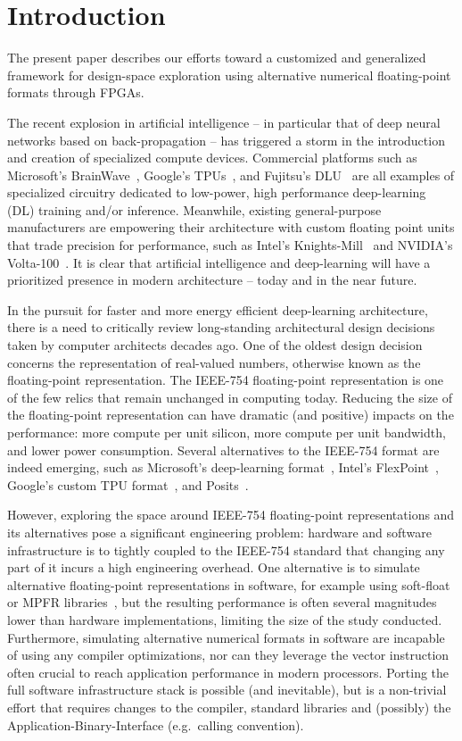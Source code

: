 \documentclass[techrep,english]{ipsj} %
\begin{document}
\section{Introduction}
The present paper describes our efforts toward a customized and generalized framework for design-space exploration using alternative numerical floating-point formats through FPGAs.

The recent explosion in artificial intelligence – in particular that of deep neural networks based on back-propagation – has triggered a storm in the introduction and creation of specialized compute devices.
Commercial platforms such as Microsoft’s BrainWave~\cite{msbrainwave}, Google’s TPUs~\cite{googletpu}, and Fujitsu’s DLU~\cite{fujitsudlu} are all examples of specialized circuitry dedicated to low-power, high performance deep-learning (DL) training and/or inference.
Meanwhile, existing general-purpose manufacturers are empowering their architecture with custom floating point units that trade precision for performance, such as Intel’s Knights-Mill~\cite{knm} and NVIDIA’s Volta-100~\cite{volta100}.
It is clear that artificial intelligence and deep-learning will have a prioritized presence in modern architecture -- today and in the near future.

In the pursuit for faster and more energy efficient deep-learning architecture, there is a need to critically review long-standing architectural design decisions taken by computer architects decades ago.
One of the oldest design decision concerns the representation of real-valued numbers, otherwise known as the floating-point representation.
The IEEE-754 floating-point representation is one of the few relics that remain unchanged in computing today.
Reducing the size of the floating-point representation can have dramatic (and positive) impacts on the performance: more compute per unit silicon, more compute per unit bandwidth, and lower power consumption.
Several alternatives to the IEEE-754 format are indeed emerging, such as Microsoft’s deep-learning format~\cite{msbrainwave}, Intel’s FlexPoint~\cite{intelflexpoint}, Google’s custom TPU format~\cite{tpuformat}, and Posits~\cite{posits}.

However, exploring the space around IEEE-754 floating-point representations and its alternatives pose a significant engineering problem: hardware and software infrastructure is to tightly coupled to the IEEE-754 standard that changing any part of it incurs a high engineering overhead.
One alternative is to simulate alternative floating-point representations in software, for example using soft-float or MPFR libraries~\cite{softfloat}, but the resulting performance is often several magnitudes lower than hardware implementations, limiting the size of the study conducted.
Furthermore, simulating alternative numerical formats in software are incapable of using any compiler optimizations, nor can they leverage the vector instruction often crucial to reach application performance in modern processors.
Porting the full software infrastructure stack is possible (and inevitable), but is a non-trivial effort that requires changes to the compiler, standard libraries and (possibly) the Application-Binary-Interface (e.g.\ calling convention).
\end{document}
